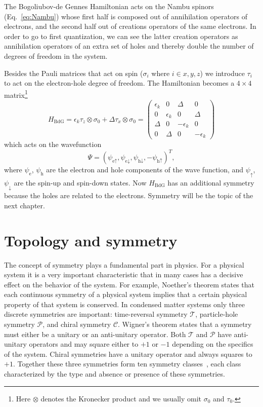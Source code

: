 The Bogoliubov-de Gennes Hamiltonian acts on the Nambu spinors (Eq.~\ref{eq:Nambu}) whose first half is composed out of annihilation operators of electrons, and the second half out of creations operators of the same electrons.
In order to go to first quantization, we can see the latter creation operators as annihilation operators of an extra set of holes and thereby double the number of degrees of freedom in the system.

Besides the Pauli matrices that act on spin ($\sigma_{i}$ where $i\in x,y,z$) we introduce $\tau_{i}$ to act on the electron-hole degree of freedom.
The Hamiltonian becomes a $4\times4$ matrix\footnote{Here $\otimes$ denotes the Kronecker product and we usually omit $\sigma_{0}$ and $\tau_{0}$.}
\[
H_{\textrm{BdG}}=\epsilon_{k}\tau_{z}\otimes\sigma_{0}+\Delta\tau_{x}\otimes\sigma_{0}=\left(\begin{array}{cccc}
\epsilon_{k} & 0 & \Delta & 0\\
0 & \epsilon_{k} & 0 & \Delta\\
\Delta & 0 & -\epsilon_{k} & 0\\
0 & \Delta & 0 & -\epsilon_{k}
\end{array}\right)
\]
which acts on the wavefunction
\begin{equation}
\Psi=\left(\psi_{\textrm{e}\uparrow},\psi_{\textrm{e}\downarrow},\psi_{\textrm{h}\downarrow},-\psi_{\textrm{h}\uparrow}\right)^{T},\label{eq:4wf}
\end{equation}
where $\psi_{\textrm{e}}$, $\psi_{\textrm{h}}$ are the electron and hole components of the wave function, and $\psi_{\uparrow}$, $\psi_{\downarrow}$ are the spin-up and spin-down states.
Now $H_{\textrm{BdG}}$ has an additional symmetry because the holes are related to the electrons.
Symmetry will be the topic of the next chapter.


\section{\label{sec:topology}Topology and symmetry}

The concept of symmetry plays a fundamental part in physics.
For a physical system it is a very important characteristic that in many cases has a decisive effect on the behavior of the system.
For example, Noether's theorem states that each continuous symmetry of a physical system implies that a certain physical property of that system is conserved.
In condensed matter systems only three discrete symmetries are important: time-reversal symmetry $\mathcal{T}$, particle-hole symmetry $\mathcal{P}$, and chiral symmetry $\mathcal{C}$.
Wigner's theorem states that a symmetry must either be a unitary or an anti-unitary operator.
Both $\mathcal{T}$ and $\mathcal{P}$ have anti-unitary operators and may square either to $+1$ or $-1$ depending on the specifics of the system.
Chiral symmetries have a unitary operator and always squares to $+1$.
Together these three symmetries form ten symmetry classes~\cite{Altland1997}, each class characterized by the type and absence or presence of these symmetries.

